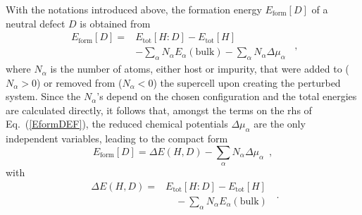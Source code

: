 \documentclass[aps,prb,twocolumn,superscriptaddress,showpacs]{revtex4}
\newcommand{\EQ}[1]{Eq.~(\ref{#1})}
\begin{document}
With the notations introduced above, the formation 
energy $E_\text{form}[D]$ of a neutral defect $D$ is obtained
from 
\begin{equation}
  \label{EformDEF}
  \begin{split}
  E_\text{form}[D] = & E_{\text{tot}}[H:D] - 
                       E_{\text{tot}}[H] \\
                    &  - \sum_\alpha N_\alpha E_\alpha(\text{bulk}) - 
                         \sum_\alpha N_\alpha\Delta\mu_\alpha    
  \end{split} \enspace,
\end{equation}
where $N_\alpha$ is the number of atoms, either host or impurity, 
that were added to ($N_\alpha>0$) or removed from ($N_\alpha<0$) 
the supercell upon creating the perturbed system.\cite{VdWN04}
Since the $N_\alpha$'s depend on the chosen configuration
and the total energies are calculated directly, it
follows that, amongst the terms on the rhs of \EQ{EformDEF},
the reduced chemical potentials $\Delta\mu_\alpha$ are
the only independent variables, leading to the compact form
\begin{equation}
  \label{EformShort}
  E_\text{form}[D] = \Delta E(H,D) - 
                    \sum_\alpha N_\alpha\Delta\mu_\alpha  \enspace,
\end{equation}
with
\begin{equation}
  \label{DeltaEform}
  \begin{aligned}
  \Delta E(H,D) = &  E_{\text{tot}}[H:D] - 
                       E_{\text{tot}}[H] \\
                    & \quad - \sum_\alpha N_\alpha E_\alpha(\text{bulk})
  \end{aligned} \enspace.
\end{equation}
\end{document}
